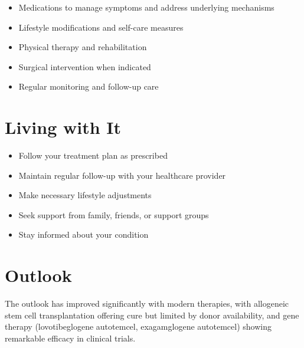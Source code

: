 \begin{itemize}[noitemsep]
  \item Medications to manage symptoms and address underlying mechanisms
  \item Lifestyle modifications and self-care measures
  \item Physical therapy and rehabilitation
  \item Surgical intervention when indicated
  \item Regular monitoring and follow-up care
\end{itemize}
\section{Living with It}
\begin{itemize}[noitemsep]
  \item Follow your treatment plan as prescribed
  \item Maintain regular follow-up with your healthcare provider
  \item Make necessary lifestyle adjustments
  \item Seek support from family, friends, or support groups
  \item Stay informed about your condition
\end{itemize}
\section{Outlook}
The outlook has improved significantly with modern therapies, with allogeneic stem cell transplantation offering cure but limited by donor availability, and gene therapy (lovotibeglogene autotemcel, exagamglogene autotemcel) showing remarkable efficacy in clinical trials.
